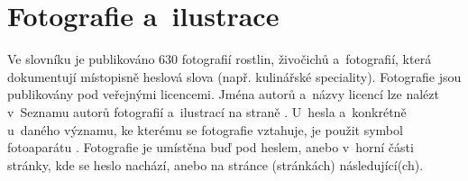 \section{Fotografie a~ilustrace}

Ve slovníku je publikováno 630 fotografií rostlin, živočichů a~fotografií, která dokumentují místopisně heslová slova (např. kulinářské speciality).
Fotografie jsou publikovány pod veřejnými licencemi. Jména autorů a~názvy licencí lze nalézt v~Seznamu autorů fotografií a~ilustrací na straně \pageref{sec:photo}. U~hesla a~konkrétně u~daného významu, ke kterému se fotografie vztahuje, je použit symbol fotoaparátu \dicsymPhoto. Fotografie je umístěna buď pod heslem, anebo v~horní části stránky, kde se heslo nachází, anebo na stránce (stránkách) následující(ch).

